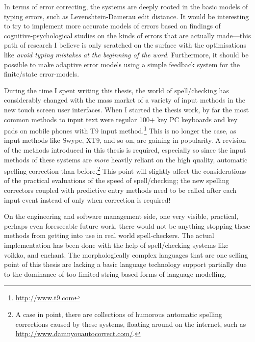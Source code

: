 \documentclass[officiallayout]{unihelcompling}
\begin{document}
In terms of error correcting, the systems are deeply rooted in the basic models
of typing errors, such as Levenshtein-Damerau edit distance. It would be
interesting to try to implement more accurate models of errors based on
findings of cognitive-psychological studies on the kinds of errors that are
actually made---this path of research I believe is only scratched on the
surface with the optimisations like \emph{avoid typing mistakes at the
beginning of the word}. Furthermore, it should be possible to make adaptive
error models using a simple feedback system for the finite\-/state
error-models.

During the time I spent writing this thesis, the world of spell\-/checking has
considerably changed with the mass market of a variety of input methods in the
new touch screen user interfaces. When I started the thesis work, by far the
most common methods to input text were regular 100+ key PC keyboards and key
pads on mobile phones with T9 input method.\footnote{\url{http://www.t9.com}}
This is no longer the case, as input methods like Swype, XT9, and so on, are
gaining in popularity. A revision of the methods introduced in this thesis is
required, especially so since the input methods of these systems are
\emph{more} heavily reliant on the high quality, automatic spelling correction
than before.\footnote{A case in point, there are collections of humorous
automatic spelling corrections caused by these systems, floating around on the
internet, such as \url{http://www.damnyouautocorrect.com/}.}  This point will
slightly affect the considerations of the practical evaluations of the speed of
spell\-/checking; the new spelling correctors coupled with predictive entry
methods need to be called after each input event instead of only when
correction is required!

On the engineering and software management side, one very visible, practical,
perhaps even foreseeable future work, there would not be anything stopping
these methods from getting into use in real world spell-checkers. The actual
implementation has been done with the help of spell\-/checking systems like
voikko, and enchant. The morphologically complex languages that are one selling
point of this thesis are lacking a basic language technology support partially
due to the dominance of too limited string-based forms of language modelling.
\end{document}
